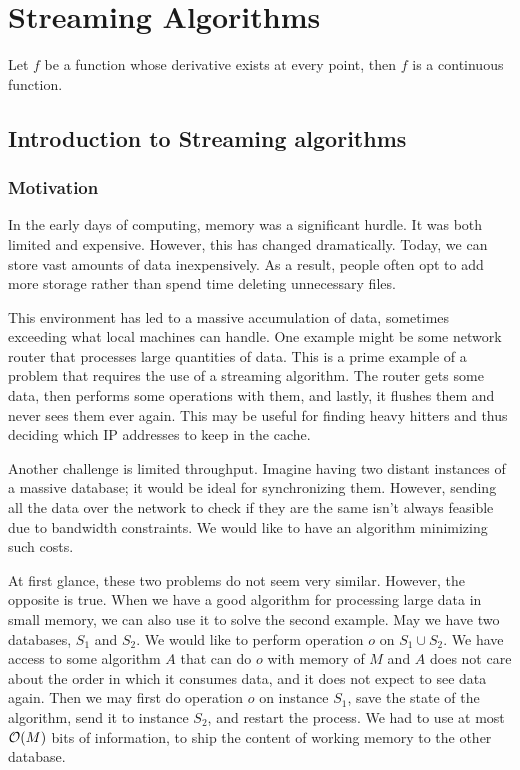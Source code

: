 \chapter{Streaming Algorithms}


\begin{defn}
\end{defn}

\begin{thm}
Let \(f\) be a function whose derivative exists at every point, then \(f\) is a continuous function.
\end{thm}

\section{Introduction to Streaming algorithms}

\subsection{Motivation}

In the early days of computing, memory was a significant hurdle. It was both limited and expensive. However, this has changed dramatically. Today, we can store vast amounts of data inexpensively. As a result, people often opt to add more storage rather than spend time deleting unnecessary files.

This environment has led to a massive accumulation of data, sometimes exceeding what local machines can handle. One example might be some network router that processes large quantities of data. This is a prime example of a problem that requires the use of a streaming algorithm. The router gets some data, then performs some operations with them, and lastly, it flushes them and never sees them ever again.  This may be useful for finding heavy hitters and thus deciding which IP addresses to keep in the cache.

Another challenge is limited throughput. Imagine having two distant instances of a massive database; it would be ideal for synchronizing them. However, sending all the data over the network to check if they are the same isn't always feasible due to bandwidth constraints. We would like to have an algorithm minimizing such costs. 

At first glance, these two problems do not seem very similar. However, the opposite is true. When we have a good algorithm for processing large data in small memory, we can also use it to solve the second example. 
May we have two databases, $S_1$ and $S_2$. We would like to perform operation $o$ on $S_1 \cup S_2$. We have access to some algorithm $A$ that can do $o$ with memory of $M$ and $A$ does not care about the order in which it consumes data, and it does not expect to see data again. Then we may first do operation $o$ on instance $S_1$, save the state of the algorithm, send it to instance $S_2$, and restart the process. We had to use at most $\mathcal{O}(M)$ bits of information, to ship the content of working memory to the other database.


